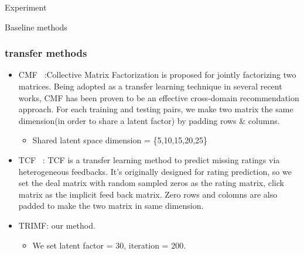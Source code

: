\begin{section}{Experiment}
\begin{subsection}{Baseline methods}
{\subsubsection{transfer methods}
\begin{itemize}
    \item CMF ~\cite{/kdd/SinghG08}:Collective Matrix Factorization is proposed for jointly factorizing two matrices. Being adopted as a transfer
learning technique in several recent works, CMF has been proven to be an effective cross-domain recommendation approach. For each training and testing pairs, we make two matrix the same dimension(in order to share a latent factor) by padding rows \& columns.
      \begin{itemize}
      \item Shared latent space dimension = \{5,10,15,20,25\}
      \end{itemize}
    \item TCF ~\cite{/ijcai/PanLXY11}: TCF is a transfer learning method to predict missing ratings via heterogeneous feedbacks. It's originally designed for rating prediction, so we set the deal matrix with random sampled zeros as the rating matrix, click matrix as the implicit feed back matrix. Zero rows and colomns are also padded to make the two matrix in same dimension.
\item TRIMF: our method.
  \begin{itemize}
  \item We set latent factor = 30, iteration = 200.
  \end{itemize}
    \end{itemize}
  
}
\end{subsection}
\end{section}

